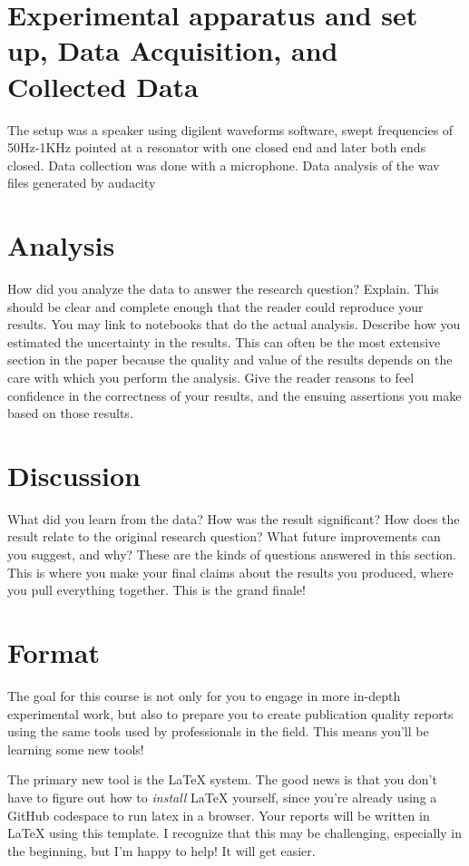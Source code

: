 \documentclass[journal, a4paper]{IEEEtran}
\begin{document}
\section{Experimental apparatus and set up, Data Acquisition, and Collected Data}
	The setup was a speaker using digilent waveforms software, swept frequencies of 50Hz-1KHz pointed at a resonator with one closed end and later both ends closed. Data collection was done with a microphone. Data analysis of the wav files generated by audacity

\section{Analysis}
	How did you analyze the data to answer the research question? Explain. This should be clear and complete enough that the reader could reproduce your results. You may link to notebooks that do the actual analysis. Describe how you estimated the uncertainty in the results. This can often be the most extensive section in the paper because the quality and value of the results depends on the care with which you perform the analysis. Give the reader reasons to feel confidence in the correctness of your results, and the ensuing assertions you make based on those results.

\section{Discussion}
	What did you learn from the data? How was the result significant? How does the result relate to the original research question? What future improvements can you suggest, and why? These are the kinds of questions answered in this section. This is where you make your final claims about the results you produced, where you pull everything together. This is the grand finale!
    
\section{Format}
	The goal for this course is not only for you to engage in more in-depth experimental work, but also to prepare you to create publication quality reports using the same tools used by professionals in the field. This means you'll be learning some new tools!

	The primary new tool is the \LaTeX{} system. The good news is that you don't have to figure out how to \textit{install} \LaTeX{} yourself, since you're already using a GitHub codespace to run latex in a browser. Your reports will be written in \LaTeX{} using this template. I recognize that this may be challenging, especially in the beginning, but I'm happy to help! It will get easier.
	
\end{document}
